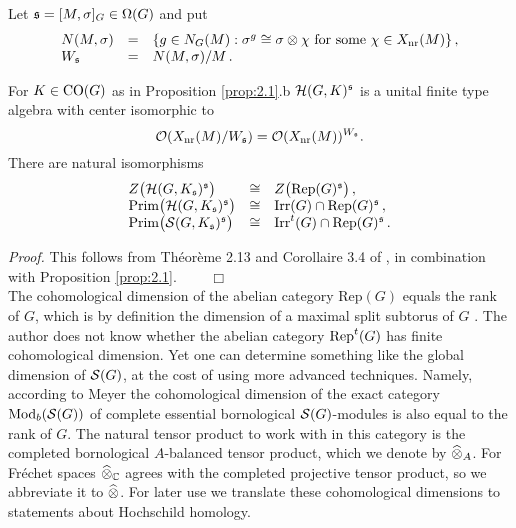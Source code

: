 Let $\mathfrak s = [M,\sigma ]_G \in \Omega (G)$ and put
\[
\begin{array}{lll}
N (M,\sigma ) & = & \{ g \in N_G (M) : \sigma^g \cong \sigma \otimes \chi 
\text{ for some } \chi \in X_{\mathrm{nr}} (M) \} \,, \\
W_{\mathfrak s} & = & N (M,\sigma ) / M \,.
\end{array}
\]
\begin{thm}\label{thm:2.15}
For $K \in \mathrm{CO}(G)$ as in Proposition \textup{\ref{prop:2.1}.b} $\mathcal H (G,K)^{\mathfrak s}$ 
is a unital finite type algebra with center isomorphic to 
\[
\mathcal O (X_{\mathrm{nr}} (M) / W_{\mathfrak s} ) = \mathcal O (X_{\mathrm{nr}} (M) )^{W_{\mathfrak s}} .
\]
There are natural isomorphisms 
\[
\begin{array}{lll}
Z \big( \mathcal H(G,K_{\mathfrak s})^{\mathfrak s} \big) & \cong & Z \big( \mathrm{Rep}(G )^{\mathfrak s} \big) \,, \\
\mathrm{Prim} \big( \mathcal H(G,K_{\mathfrak s})^{\mathfrak s} \big) & \cong & 
 \mathrm{Irr}(G) \cap \mathrm{Rep}(G )^{\mathfrak s} \,, \\
\mathrm{Prim} \big( \mathcal S(G,K_{\mathfrak s})^{\mathfrak s} \big) & \cong &
 \mathrm{Irr}^t(G) \cap \mathrm{Rep}(G )^{\mathfrak s} \,.
\end{array}
\]
\end{thm}
\emph{Proof.}
This follows from Th\'eor\`eme 2.13 and Corollaire 3.4 of \cite{BeDe},
in combination with Proposition \ref{prop:2.1}. $\qquad \Box$
\\[2mm]

The cohomological dimension of the abelian category Rep$ (G)$ equals the 
rank of $G$, which is by definition the dimension of a maximal split
subtorus of $G$ \cite[Section II.3]{ScSt}. The author does not
know whether the abelian category $\mathrm{Rep}^t (G)$ has finite
cohomological dimension. Yet one can determine something like
the global dimension of $\mathcal S (G)$, at the cost of using more
advanced techniques. Namely, according to Meyer \cite[Theorem 29]{Mey} 
the cohomological dimension of the exact category
$\mathrm{Mod}_b (\mathcal S (G))$ of complete essential bornological
$\mathcal S (G)$-modules is also equal to the rank of $G$. The natural
tensor product to work with in this category is the completed
bornological $A$-balanced tensor product, which we denote by
$\widehat{\otimes}_A$. For Fr\'echet spaces $\widehat{\otimes}_{\mathbb C}$ agrees with the
completed projective tensor product, so we abbreviate it to $\widehat{\otimes}$.
For later use we translate these cohomological dimensions to 
statements about Hochschild homology.

